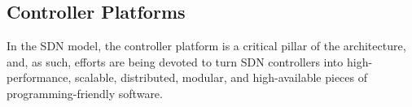 %
%
%
%
%
%
%
%
%
%
%
%
%


\subsection{Controller Platforms}

In the SDN model, the controller platform is a critical pillar of the architecture, and, as such, 
efforts are being devoted to turn SDN controllers into high-performance, scalable, distributed, 
modular, and high-available pieces of programming-friendly software.


